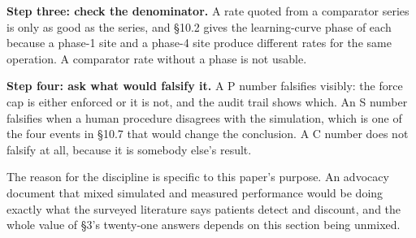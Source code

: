 \textbf{Step three: check the denominator.} A rate quoted from a comparator
series is only as good as the series, and \S 10.2 gives the learning-curve phase
of each because a phase-1 site and a phase-4 site produce different rates for
the same operation. A comparator rate without a phase is not usable.

\textbf{Step four: ask what would falsify it.} A P number falsifies visibly: the
force cap is either enforced or it is not, and the audit trail shows which. An S
number falsifies when a human procedure disagrees with the simulation, which is
one of the four events in \S 10.7 that would change the conclusion. A C number
does not falsify at all, because it is somebody else's result.

The reason for the discipline is specific to this paper's purpose. An advocacy
document that mixed simulated and measured performance would be doing exactly
what the surveyed literature says patients detect and discount, and the whole
value of \S 3's twenty-one answers depends on this section being unmixed.
